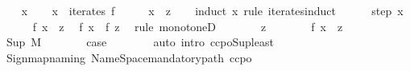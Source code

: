 \begin{isabellebody}
\ \ \isamarkupfalse%
\ x\isanewline
\ \ \isamarkupfalse%
\ {\isachardoublequoteopen}x\ {\isasymin}\ iterates\ f{\isachardoublequoteclose}\isanewline
\ \ \isamarkupfalse%
\ \isamarkupfalse%
\ {\isachardoublequoteopen}x\ {\isasymle}\ z{\isachardoublequoteclose}\isanewline
\ \ \isamarkupfalse%
\ {\isacharparenleft}{\kern0pt}induct\ x\ rule{\isacharcolon}{\kern0pt}\ iterates{\isachardot}{\kern0pt}induct{\isacharparenright}{\kern0pt}\isanewline
\ \ \ \ \isamarkupfalse%
\ {\isacharparenleft}{\kern0pt}step\ x{\isacharparenright}{\kern0pt}\isanewline
\ \ \ \ \isamarkupfalse%
\ f\ {\isacartoucheopen}x\ {\isasymle}\ z{\isacartoucheclose}\ \isamarkupfalse%
\ {\isachardoublequoteopen}f\ x\ {\isasymle}\ f\ z{\isachardoublequoteclose}\ \isamarkupfalse%
\ {\isacharparenleft}{\kern0pt}rule\ monotoneD{\isacharparenright}{\kern0pt}\isanewline
\ \ \ \ \isamarkupfalse%
\ \isamarkupfalse%
\ z\isanewline
\ \ \ \ \isamarkupfalse%
\ \isamarkupfalse%
\ {\isachardoublequoteopen}f\ x\ {\isasymle}\ z{\isachardoublequoteclose}\ \isacommand{{\isachardot}{\kern0pt}}\isamarkupfalse%
\isanewline
\ \ \isamarkupfalse%
\isanewline
\ \ \ \ \isamarkupfalse%
\ {\isacharparenleft}{\kern0pt}Sup\ M{\isacharparenright}{\kern0pt}\isanewline
\ \ \ \ \isamarkupfalse%
\ \isamarkupfalse%
\ {\isacharquery}{\kern0pt}case\isanewline
\ \ \ \ \ \ \isamarkupfalse%
\ {\isacharparenleft}{\kern0pt}auto\ intro{\isacharcolon}{\kern0pt}\ ccpo{\isacharunderscore}{\kern0pt}Sup{\isacharunderscore}{\kern0pt}least{\isacharparenright}{\kern0pt}\isanewline
\ \ \isamarkupfalse%
\isanewline
{}\isamarkupfalse%
%
\endisatagproof
{\isafoldproof}%
%
\isadelimproof
\isanewline
%
\endisadelimproof
\isanewline
{}\isamarkupfalse%
%
\isadelimdocument
%
\endisadelimdocument
%
\isatagdocument
%
\isamarkuptrue%
%
\endisatagdocument
{\isafolddocument}%
%
\isadelimdocument
%
\endisadelimdocument
%
\isadelimML
%
\endisadelimML
%
\isatagML
{}\isamarkupfalse%
\ {\isacartoucheopen}Sign{\isachardot}{\kern0pt}map{\isacharunderscore}{\kern0pt}naming\ {\isacharparenleft}{\kern0pt}Name{\isacharunderscore}{\kern0pt}Space{\isachardot}{\kern0pt}mandatory{\isacharunderscore}{\kern0pt}path\ {\isachardoublequote}{\kern0pt}ccpo{\isachardoublequote}{\kern0pt}{\isacharparenright}{\kern0pt}{\isacartoucheclose}%

\end{isabellebody}
